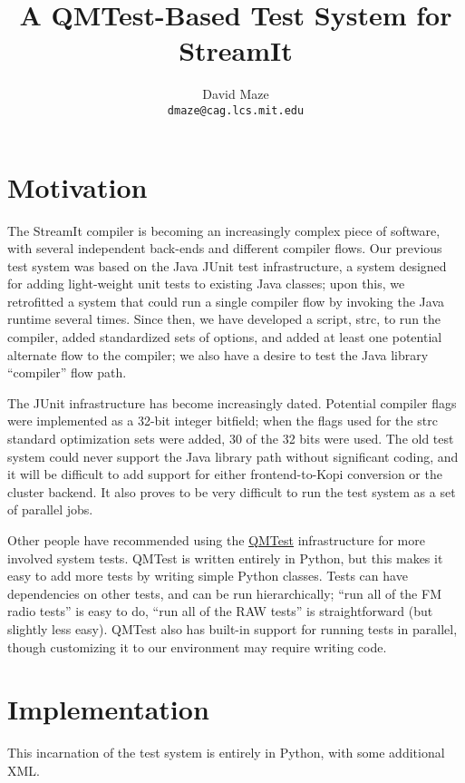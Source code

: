 \documentclass[11pt]{article}
\title{A QMTest-Based Test System for StreamIt}
\author{David Maze\\\texttt{dmaze@cag.lcs.mit.edu}}
\begin{document}
\maketitle
\tableofcontents

\section{Motivation}

The StreamIt compiler is becoming an increasingly complex piece of
software, with several independent back-ends and different compiler
flows.  Our previous test system was based on the Java JUnit test
infrastructure, a system designed for adding light-weight unit tests
to existing Java classes; upon this, we retrofitted a system that
could run a single compiler flow by invoking the Java runtime several
times.  Since then, we have developed a script, \textsf{strc}, to run
the compiler, added standardized sets of options, and added at least
one potential alternate flow to the compiler; we also have a desire to
test the Java library ``compiler'' flow path.

The JUnit infrastructure has become increasingly dated.  Potential
compiler flags were implemented as a 32-bit integer bitfield; when the
flags used for the \textsf{strc} standard optimization sets were
added, 30 of the 32 bits were used.  The old test system could never
support the Java library path without significant coding, and it will
be difficult to add support for either frontend-to-Kopi conversion or
the cluster backend.  It also proves to be very difficult to run the
test system as a set of parallel jobs.

Other people have recommended using the
\href{http://www.qmtest.com/}{QMTest} infrastructure for more involved
system tests.  QMTest is written entirely in Python, but this makes it
easy to add more tests by writing simple Python classes.  Tests can
have dependencies on other tests, and can be run hierarchically; ``run
all of the FM radio tests'' is easy to do, ``run all of the RAW
tests'' is straightforward (but slightly less easy).  QMTest also has
built-in support for running tests in parallel, though customizing it
to our environment may require writing code.

\section{Implementation}

This incarnation of the test system is entirely in Python, with some
additional XML.
\end{document}
